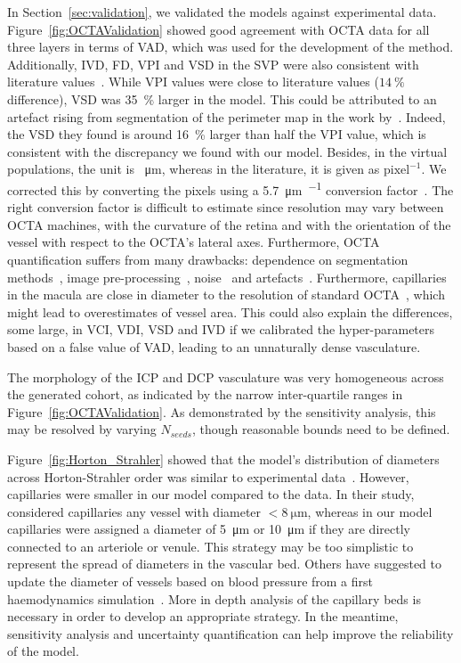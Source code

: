 \documentclass[11pt,]{article}
\begin{document}
In Section~\ref{sec:validation}, we validated the models against experimental data.
Figure~\ref{fig:OCTAValidation} showed good agreement with OCTA data for all three layers in terms of VAD, which was used for the development of the method.
Additionally, IVD, FD, VPI and VSD in the SVP were also consistent with literature values~\cite{Chu2016,Ma2021,Liu_2021}.
While VPI values were close to literature values ($\SI{14}{\percent}$ difference), VSD was \SI{35}{\percent} larger in the model.
This could be attributed to an artefact rising from segmentation of the perimeter map in the work by~\cite{Chu2016}.
Indeed, the VSD they found is around \SI{16}{\percent} larger than half the VPI value, which is consistent with the discrepancy we found with our model.
Besides, in the virtual populations, the unit is \SI{}{\micro\metre}, whereas in the literature, it is given as $\text{pixel}^{-1}$.
We corrected this by converting the pixels using a \SI{5.7}{\micro\metre\per{}} conversion factor~\cite{Spectralis}.
The right conversion factor is difficult to estimate since resolution may vary between OCTA machines, with the curvature of the retina and with the orientation of the vessel with respect to the OCTA's lateral axes. Furthermore, OCTA quantification suffers from many drawbacks: dependence on segmentation methods~\cite{Mehta_2020}, image pre-processing~\cite{Mehta_2019}, noise~\cite{Szpernal2023} and artefacts~\cite{Yao_2020}.
Furthermore, capillaries in the macula are close in diameter to the resolution of standard OCTA~\cite{Chu2016}, which might lead to overestimates of vessel area.
This could also explain the differences, some large, in VCI, VDI, VSD and IVD if we calibrated the hyper-parameters based on a false value of VAD, leading to an unnaturally dense vasculature.

The morphology of the ICP and DCP vasculature was very homogeneous across the generated cohort, as indicated by the narrow inter-quartile ranges in Figure~\ref{fig:OCTAValidation}.
As demonstrated by the sensitivity analysis, this may be resolved by varying $N_{seeds}$, though reasonable bounds need to be defined.

Figure~\ref{fig:Horton_Strahler} showed that the model's distribution of diameters across Horton-Strahler order was similar to experimental data~\cite{An2020}.
However, capillaries were smaller in our model compared to the data.
In their study, ~\cite{An2020} considered capillaries any vessel with diameter $<\SI{8}{\micro\metre}$, whereas in our model capillaries were assigned a diameter of \SI{5}{\micro\metre} or \SI{10}{\micro\metre} if they are directly connected to an arteriole or venule.
This strategy may be too simplistic to represent the spread of diameters in the vascular bed.
Others have suggested to update the diameter of vessels based on blood pressure from a first haemodynamics simulation~\cite{Linninger2013}.
More in depth analysis of the capillary beds is necessary in order to develop an appropriate strategy.
In the meantime, sensitivity analysis and uncertainty quantification can help improve the reliability of the model.
\end{document}
